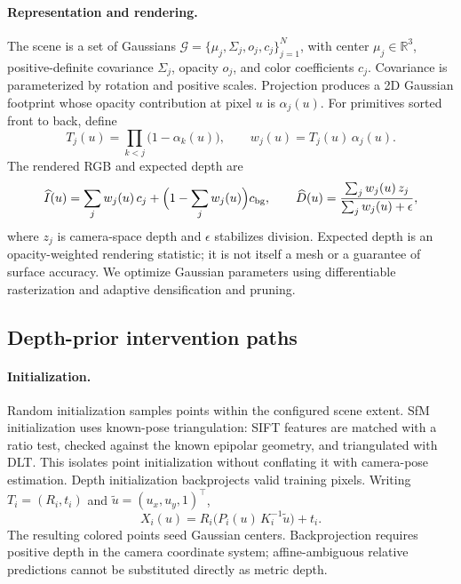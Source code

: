 \documentclass[10pt,a4paper]{article}
\begin{document}
\paragraph{Representation and rendering.} The scene is a set of Gaussians
$\mathcal{G}=\{\mu_j,\Sigma_j,o_j,c_j\}_{j=1}^{N}$, with center
$\mu_j\in\mathbb{R}^3$, positive-definite covariance $\Sigma_j$, opacity $o_j$, and
color coefficients $c_j$. Covariance is parameterized by rotation and positive
scales. Projection produces a 2D Gaussian footprint whose opacity contribution at
pixel $u$ is $\alpha_j(u)$. For primitives sorted front to back, define
\begin{equation}
T_j(u)=\prod_{k<j}\bigl(1-\alpha_k(u)\bigr),\qquad w_j(u)=T_j(u)\,\alpha_j(u).
\end{equation}
The rendered RGB and expected depth are
\begin{equation}
\widehat{I}(u)=\sum_j w_j(u)\,c_j+\Bigl(1-\sum_j w_j(u)\Bigr)c_{\mathrm{bg}},\qquad
\widehat{D}(u)=\frac{\sum_j w_j(u)\,z_j}{\sum_j w_j(u)+\epsilon},
\end{equation}
where $z_j$ is camera-space depth and $\epsilon$ stabilizes division. Expected depth
is an opacity-weighted rendering statistic; it is not itself a mesh or a guarantee of
surface accuracy. We optimize Gaussian parameters using differentiable rasterization
and adaptive densification and pruning.

\subsection{Depth-prior intervention paths}

\paragraph{Initialization.} Random initialization samples points within the
configured scene extent. SfM initialization uses known-pose triangulation: SIFT
features are matched with a ratio test, checked against the known epipolar geometry,
and triangulated with DLT. This isolates point initialization without conflating it
with camera-pose estimation. Depth initialization backprojects valid training pixels.
Writing $T_i=(R_i,t_i)$ and $\tilde{u}=(u_x,u_y,1)^\top$,
\begin{equation}
X_i(u)=R_i\bigl(P_i(u)\,K_i^{-1}\tilde{u}\bigr)+t_i.
\end{equation}
The resulting colored points seed Gaussian centers. Backprojection requires positive
depth in the camera coordinate system; affine-ambiguous relative predictions cannot
be substituted directly as metric depth.
\end{document}
